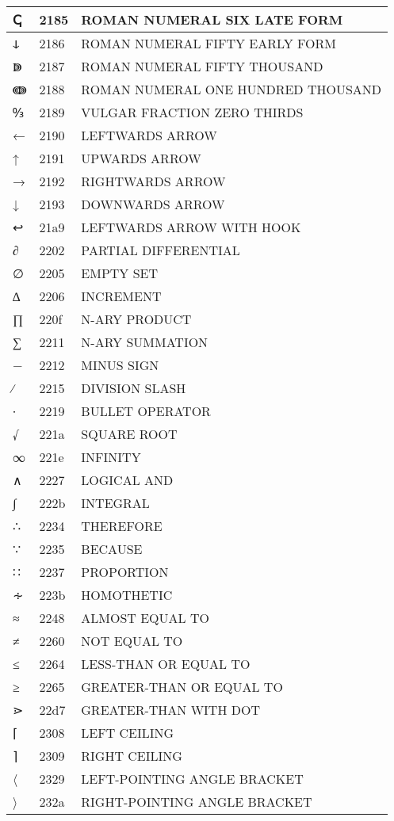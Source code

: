 \documentclass[12pt,letterpaper,openany]{book}
\begin{document}
\begin{center}
\begin{supertabular}{|m{0.25in}|m{0.5in}|m{4in}|}
ↅ & 2185 & ROMAN NUMERAL SIX LATE FORM\\\hline
ↆ & 2186 & ROMAN NUMERAL FIFTY EARLY FORM\\\hline
ↇ & 2187 & ROMAN NUMERAL FIFTY THOUSAND\\\hline
ↈ & 2188 & ROMAN NUMERAL ONE HUNDRED THOUSAND\\\hline
↉ & 2189 & VULGAR FRACTION ZERO THIRDS\\\hline
← & 2190 & LEFTWARDS ARROW\\\hline
↑ & 2191 & UPWARDS ARROW\\\hline
→ & 2192 & RIGHTWARDS ARROW\\\hline
↓ & 2193 & DOWNWARDS ARROW\\\hline
↩ & 21a9 & LEFTWARDS ARROW WITH HOOK\\\hline
∂ & 2202 & PARTIAL DIFFERENTIAL\\\hline
∅ & 2205 & EMPTY SET\\\hline
∆ & 2206 & INCREMENT\\\hline
∏ & 220f & N-ARY PRODUCT\\\hline
∑ & 2211 & N-ARY SUMMATION\\\hline
− & 2212 & MINUS SIGN\\\hline
∕ & 2215 & DIVISION SLASH\\\hline
∙ & 2219 & BULLET OPERATOR\\\hline
√ & 221a & SQUARE ROOT\\\hline
∞ & 221e & INFINITY\\\hline
∧ & 2227 & LOGICAL AND\\\hline
∫ & 222b & INTEGRAL\\\hline
∴ & 2234 & THEREFORE\\\hline
∵ & 2235 & BECAUSE\\\hline
∷ & 2237 & PROPORTION\\\hline
∻ & 223b & HOMOTHETIC\\\hline
≈ & 2248 & ALMOST EQUAL TO\\\hline
≠ & 2260 & NOT EQUAL TO\\\hline
≤ & 2264 & LESS-THAN OR EQUAL TO\\\hline
≥ & 2265 & GREATER-THAN OR EQUAL TO\\\hline
⋗ & 22d7 & GREATER-THAN WITH DOT\\\hline
⌈ & 2308 & LEFT CEILING\\\hline
⌉ & 2309 & RIGHT CEILING\\\hline
〈 & 2329 & LEFT-POINTING ANGLE BRACKET\\\hline
〉 & 232a & RIGHT-POINTING ANGLE BRACKET\\\hline

\end{supertabular}
\end{center}
\end{document}
